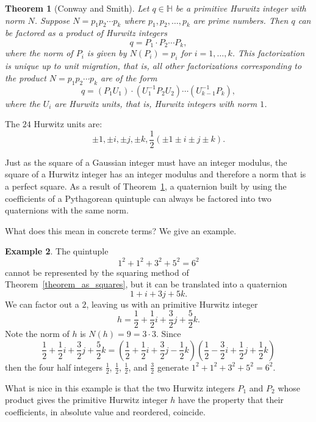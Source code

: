 \documentclass[12pt,table]{article}
\newtheorem{theorem}{Theorem}[section]
\theoremstyle{definition}
\newtheorem{example}[theorem]{Example}
\theoremstyle{remark}
\newcommand{\Hhh}{\mathbb H}
\numberwithin{equation}{section}
\begin{document}
\begin{theorem}[Conway and Smith]
\label{theorem_unique_factorization}
Let $q \in \Hhh$ be a primitive Hurwitz integer with norm
$N$.  Suppose $N = p_1 p_2 \cdots p_k$ where 
$p_1, p_2, \ldots, p_k$ are prime numbers.
Then
$q$ can be factored as a product of Hurwitz integers
$$
   q = P_1 \cdot P_2 \cdots P_k,
$$
where the norm of $P_i$ is
given by $N(P_i) = p_i$ for $i = 1, \ldots, k$.
This factorization is unique up to unit migration, that is,
all other factorizations corresponding to
the product  $N = p_1 p_2 \cdots p_k$ 
are of the form
$$
   q = (P_1 U_1) \cdot (U_1^{-1} P_2 U_2) \cdots (U_{k-1}^{-1}P_k),
$$
where the $U_i$ are Hurwitz units, that is,
Hurwitz integers with norm $1$.
\end{theorem}
The $24$ Hurwitz units are:
$$
  \pm 1, \pm i, \pm j, \pm k, \frac{1}{2}(\pm 1 \pm i \pm j \pm k).
$$


Just as the square of a Gaussian integer must have
an integer modulus, the square of a Hurwitz integer has an integer modulus
and therefore a norm that is a perfect square. 
As a result of Theorem~\ref{theorem_unique_factorization},
a quaternion
built by using  the coefficients of a Pythagorean quintuple can 
always be factored into two 
quaternions with the same norm.



What does this mean in concrete terms? We give an example.

\begin{example}
{\rm The quintuple 
$$
     1^2+ 1^2+ 3^2+ 5^2= 6^2
$$
cannot be represented by the squaring method
of Theorem~\ref{theorem_as_squares},
but it can be translated into 
a quaternion
$$
      1 + i + 3j + 5k.
$$
We can factor out a $2$, leaving us with an 
primitive Hurwitz integer
$$
     h= \frac{1}{2} + \frac{1}{2}i + \frac{3}{2}j + \frac{5}{2}k.
$$
Note the norm of $h$ is $N(h) = 9 = 3 \cdot 3$.
Since 
$$
\frac{1}{2} + \frac{1}{2}i + \frac{3}{2}j + \frac{5}{2}k
=
\left(\frac{1}{2}+\frac{1}{2}i+\frac{3}{2}j-\frac{1}{2}k\right)
\left(\frac{1}{2}-\frac{3}{2}i+\frac{1}{2}j+\frac{1}{2}k\right) 
$$
then 
the four half integers $\frac{1}{2}$, $\frac{1}{2}$, $\frac{1}{2}$, 
and $\frac{3}{2}$ 
generate $1^2+ 1^2+ 3^2+ 5^2= 6^2$. 
}
\end{example}

What is nice in this example is that the two Hurwitz integers 
$P_1$ and $P_2$ whose
product gives the primitive Hurwitz integer $h$ have the property that
their coefficients, in absolute value and reordered, coincide.
\end{document}
